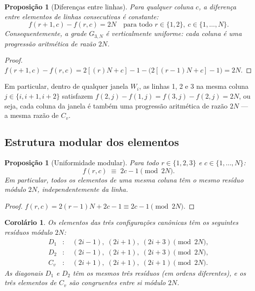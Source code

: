 \documentclass[12pt, a4paper]{article}
\newtheorem{corolario}[lema]{Corolário}
\newtheorem{proposicao}[lema]{Proposição}
\begin{document}
	\begin{proposicao}[Diferenças entre linhas]
		\label{prop:dif}
		Para qualquer coluna $c$, a diferença entre elementos de linhas consecutivas é
		constante:
		\[
		f(r+1,c) - f(r,c) = 2N \quad \text{para todo } r\in\{1,2\},\ c\in\{1,\dots,N\}.
		\]
		Consequentemente, a grade $G_{3,N}$ é \emph{verticalmente uniforme}: cada coluna
		é uma progressão aritmética de razão $2N$.
	\end{proposicao}
	
	\begin{proof}
		$f(r+1,c)-f(r,c)=2[(r)N+c]-1-\bigl(2[(r-1)N+c]-1\bigr)=2N$.
	\end{proof}
	
	Em particular, dentro de qualquer janela $W_i$, as linhas 1, 2 e 3 na mesma coluna
	$j\in\{i,i+1,i+2\}$ satisfazem $f(2,j)-f(1,j)=f(3,j)-f(2,j)=2N$, ou seja,
	cada coluna da janela é também uma progressão aritmética de razão $2N$ — a mesma
	razão de $C_v$.
	
	\subsection{Estrutura modular dos elementos}
	
	\begin{proposicao}[Uniformidade modular]
		\label{prop:mod}
		Para todo $r\in\{1,2,3\}$ e $c\in\{1,\dots,N\}$:
		\[
		f(r,c) \;\equiv\; 2c - 1 \pmod{2N}.
		\]
		Em particular, todos os elementos de uma mesma coluna têm o mesmo resíduo módulo
		$2N$, independentemente da linha.
	\end{proposicao}
	
	\begin{proof}
		$f(r,c)=2(r-1)N+2c-1\equiv 2c-1\pmod{2N}$.
	\end{proof}
	
	\begin{corolario}
		Os elementos das três configurações canônicas têm os seguintes resíduos módulo $2N$:
		\begin{align*}
			D_1 &:\quad (2i-1),\;(2i+1),\;(2i+3)\pmod{2N},\\
			D_2 &:\quad (2i-1),\;(2i+1),\;(2i+3)\pmod{2N},\\
			C_v &:\quad (2i+1),\;(2i+1),\;(2i+1)\pmod{2N}.
		\end{align*}
		As diagonais $D_1$ e $D_2$ têm os mesmos três resíduos (em ordens diferentes), e
		os três elementos de $C_v$ são congruentes entre si módulo $2N$.
	\end{corolario}
	
\end{document}
